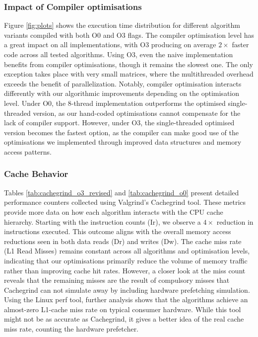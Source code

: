 \subsubsection{Impact of Compiler optimisations}\label{sec:compiler_impact}
Figure \ref{fig:plots} shows the execution time distribution for different algorithm variants compiled with both O0 and O3 flags. 
The compiler optimisation level has a great impact on all implementations, with O3 producing on average $2\times$ faster code across all tested algorithms.
Using O3, even the naive implementation benefits from compiler optimisations, though it remains the slowest one. 
The only exception takes place with very small matrices, where the multithreaded overhead exceeds the benefit of parallelization.
Notably, compiler optimisation interacts differently with our algorithmic improvements depending on the optimisation level. 
Under O0, the 8-thread implementation outperforms the optimised single-threaded version, as our hand-coded optimisations cannot compensate for the lack of compiler support. 
However, under O3, the single-threaded optimised version becomes the fastest option, as the compiler can make good use of the optimisations we implemented through improved data structures and memory access patterns.

\subsubsection{Cache Behavior}\label{sec:cache_beh}
Tables \ref{tab:cachegrind_o3_revised} and \ref{tab:cachegrind_o0} present detailed performance counters collected using Valgrind's Cachegrind tool.
These metrics provide more data on how each algorithm interacts with the CPU cache hierarchy.
Starting with the instruction counts (Ir), we observe a $4\times$ reduction in instructions executed. This outcome aligns with the overall memory access reductions seen in both data reads (Dr) and writes (Dw).
The cache miss rate (L1 Read Misses) remains constant across all algorithms and optimisation levels, indicating that our optimisations primarily reduce the volume of memory traffic rather than improving cache hit rates.
However, a closer look at the miss count reveals that the remaining misses are the result of compulsory misses that Cachegrind can not simulate away by including hardware prefetching simulation.
Using the Linux perf tool, further analysis shows that the algorithms achieve an almost-zero L1-cache miss rate on typical consumer hardware.
While this tool might not be as accurate as Cachegrind, it gives a better idea of the real cache miss rate, counting the hardware prefetcher.

